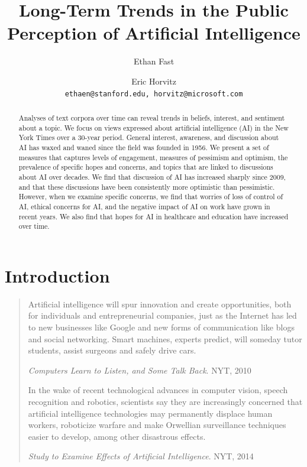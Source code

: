 \documentclass[letterpaper]{article}
\begin{document}
\title{Long-Term Trends in the Public Perception of Artificial Intelligence}
\author{Ethan Fast \and Eric Horvitz\\
{\tt ethaen@stanford.edu, horvitz@microsoft.com}}

\maketitle
\begin{abstract}
Analyses of text corpora over time can reveal trends in beliefs, interest, and sentiment about a topic. We focus on views expressed about artificial intelligence (AI) in the New York Times over a 30-year period. General interest, awareness, and discussion about AI has waxed and waned since the field was founded in 1956. We present a set  of measures that captures levels of engagement, measures of pessimism and optimism, the prevalence of specific hopes and concerns, and topics that are linked to discussions about AI over decades. We find that discussion of AI has increased sharply since 2009, and that these discussions have been consistently more optimistic than pessimistic. However, when we examine specific concerns, we find that worries of loss of control of AI, ethical concerns for AI, and the negative impact of AI on work have grown in recent years. We also find that hopes for AI in healthcare and education have increased over time.
\end{abstract}

\section{Introduction}

\begin{quote}
\footnotesize
Artificial intelligence will spur innovation and create opportunities, both for individuals and entrepreneurial companies, just as the Internet has led to new businesses like Google and new forms of communication like blogs and social networking. Smart machines, experts predict, will someday  tutor students, assist surgeons and safely drive cars.

\textit{Computers Learn to Listen, and Some Talk Back}. NYT, 2010

In the wake of recent technological advances in computer vision, speech recognition and robotics, scientists say they are increasingly concerned that artificial intelligence technologies may permanently displace human workers, roboticize warfare and make Orwellian surveillance techniques easier to develop, among other disastrous effects.

\textit{Study to Examine Effects of Artificial Intelligence}. NYT, 2014

\normalsize
\end{quote}
\end{document}
